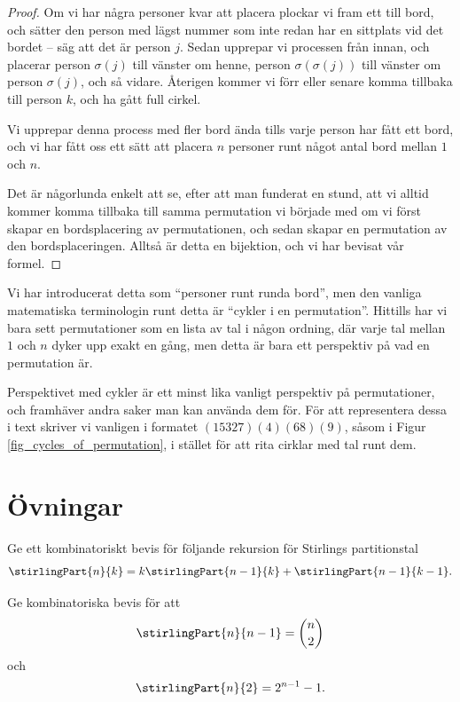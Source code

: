 \documentclass[nobib]{tufte-handout}
\begin{document}
\begin{theorem}
\begin{proof}
    Om vi har några personer kvar att placera plockar vi fram ett till bord, och sätter den person med lägst nummer som inte redan har en sittplats vid det bordet -- säg att det är person $j$. Sedan upprepar vi processen från innan, och placerar person $\sigma(j)$ till vänster om henne, person $\sigma(\sigma(j))$ till vänster om person $\sigma(j)$, och så vidare. Återigen kommer vi förr eller senare komma tillbaka till person $k$, och ha gått full cirkel.

    Vi upprepar denna process med fler bord ända tills varje person har fått ett bord, och vi har fått oss ett sätt att placera $n$ personer runt något antal bord mellan $1$ och $n$.

    Det är någorlunda enkelt att se, efter att man funderat en stund, att vi alltid kommer komma tillbaka till samma permutation vi började med om vi först skapar en bordsplacering av permutationen, och sedan skapar en permutation av den bordsplaceringen. Alltså är detta en bijektion, och vi har bevisat vår formel.
  \end{proof}
\end{theorem}

\begin{remark}
  Vi har introducerat detta som ``personer runt runda bord'', men den vanliga matematiska terminologin runt detta är ``cykler i en permutation''. Hittills har vi bara sett permutationer som en lista av tal i någon ordning, där varje tal mellan $1$ och $n$ dyker upp exakt en gång, men detta är bara ett perspektiv på vad en permutation är.

  Perspektivet med cykler är ett minst lika vanligt perspektiv på permutationer, och framhäver andra saker man kan använda dem för. För att representera dessa i text skriver vi vanligen i formatet $(15327)(4)(68)(9)$, såsom i Figur \ref{fig_cycles_of_permutation}, i stället för att rita cirklar med tal runt dem.
\end{remark}

\section{Övningar}

\begin{xca}
  Ge ett kombinatoriskt bevis för följande rekursion för Stirlings partitionstal
  $$\stirlingPart{n}{k} = k\stirlingPart{n-1}{k} + \stirlingPart{n-1}{k-1}.$$
\end{xca}

\begin{xca}
  Ge kombinatoriska bevis för att
  $$\stirlingPart{n}{n-1} = \binom{n}{2}$$
  och
  $$\stirlingPart{n}{2} = 2^{n-1} - 1.$$
\end{xca}
\end{document}
